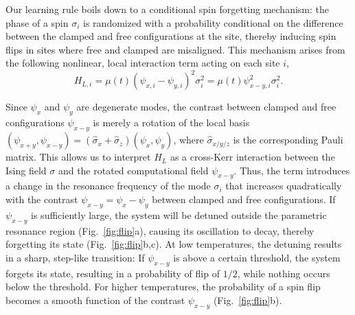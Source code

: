 Our learning rule boils down to a conditional spin forgetting mechanism: the phase of a spin $\sigma_i$ is randomized with a probability conditional on the difference between the clamped and free configurations at the site, thereby inducing spin flips in sites where free and clamped are misaligned. This mechanism arises from the following nonlinear, local interaction term acting on each site $i$,
\begin{equation}
H_{L,i}=\mu(t)\left( \psi_{x,i}-\psi_{y,i} \right)^2\sigma^2_i =\mu(t)\psi_{x-y,i}^2\sigma_i^2.
\label{eqn:localterm}
\end{equation}

Since $\psi_x$ and $\psi_y$ are degenerate modes, the contrast between clamped and free configurations $\psi_{x-y}$ is merely a rotation of the local basis $(\psi_{x+y}, \psi_{x-y})=(\hat{\sigma}_x+\hat{\sigma}_z)(\psi_x, \psi_y)$, where $\hat{\sigma}_{x/y/z}$ is the corresponding Pauli matrix. This allows us to interpret $H_L$ as a cross-Kerr interaction between the Ising field $\sigma$ and the rotated computational field $\psi_{x-y}$. Thus, the term introduces a change in the resonance frequency of the mode $\sigma_i$ that increases quadratically with the contrast $\psi_{x-y} =\psi_x-\psi_y$ between clamped and free configurations. If $\psi_{x-y}$ is sufficiently large, the system will be detuned outside the parametric resonance region (Fig.~\ref{fig:flip}a), causing its oscillation to decay, thereby forgetting its state (Fig.~\ref{fig:flip}b,c).  At low temperatures, the detuning results in a sharp, step-like transition: If $\psi_{x-y}$ is above a certain threshold, the system forgets its state, resulting in a probability of flip of $1/2$, while nothing occurs below the threshold. For higher temperatures, the probability of a spin flip becomes a smooth function of the contrast $\psi_{x-y}$ (Fig.~\ref{fig:flip}b). 
